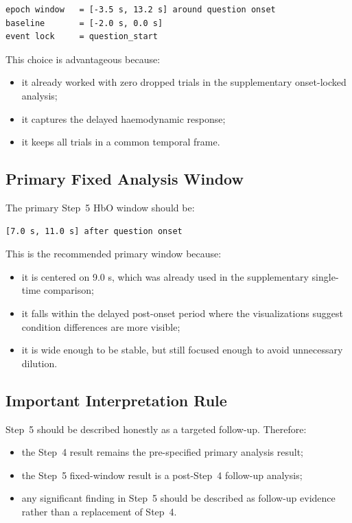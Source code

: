 \begin{verbatim}
epoch window   = [-3.5 s, 13.2 s] around question onset
baseline       = [-2.0 s, 0.0 s]
event lock     = question_start
\end{verbatim}

This choice is advantageous because:
\begin{itemize}
    \item it already worked with zero dropped trials in the supplementary onset-locked analysis;
    \item it captures the delayed haemodynamic response;
    \item it keeps all trials in a common temporal frame.
\end{itemize}

\subsection{Primary Fixed Analysis Window}
The primary Step~5 HbO window should be:
\begin{verbatim}
[7.0 s, 11.0 s] after question onset
\end{verbatim}

This is the recommended primary window because:
\begin{itemize}
    \item it is centered on 9.0 s, which was already used in the supplementary single-time comparison;
    \item it falls within the delayed post-onset period where the visualizations suggest condition
    differences are more visible;
    \item it is wide enough to be stable, but still focused enough to avoid unnecessary dilution.
\end{itemize}

\subsection{Important Interpretation Rule}
Step~5 should be described honestly as a targeted follow-up.
Therefore:
\begin{itemize}
    \item the Step~4 result remains the pre-specified primary analysis result;
    \item the Step~5 fixed-window result is a post-Step~4 follow-up analysis;
    \item any significant finding in Step~5 should be described as follow-up evidence rather than
    a replacement of Step~4.
\end{itemize}

